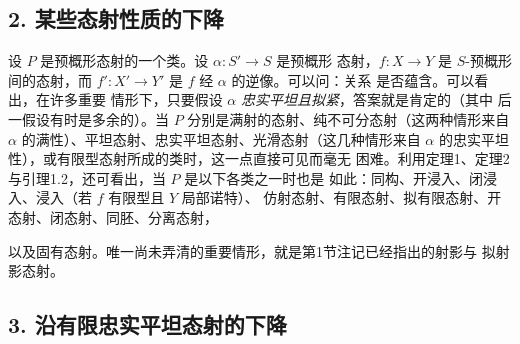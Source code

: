 \subsection*{2. 某些态射性质的下降}

设 $P$ 是预概形态射的一个类。设 $\alpha:S'\longrightarrow S$ 是预概形
态射，$f:X\longrightarrow Y$ 是 $S$-预概形间的态射，而
$f':X'\longrightarrow Y'$ 是 $f$ 经 $\alpha$ 的逆像。可以问：关系
 是否蕴含。可以看出，在许多重要
情形下，只要假设 $\alpha$ \emph{忠实平坦且拟紧}，答案就是肯定的（其中
后一假设有时是多余的）。当 $P$ 分别是满射的态射、纯不可分态射（这两种情形来自
$\alpha$ 的满性）、平坦态射、忠实平坦态射、光滑态射（这几种情形来自
$\alpha$ 的忠实平坦性），或有限型态射所成的类时，这一点直接可见而毫无
困难。利用定理1、定理2与引理1.2，还可看出，当 $P$ 是以下各类之一时也是
如此：同构、开浸入、闭浸入、浸入（若 $f$ 有限型且 $Y$ 局部诺特）、
仿射态射、有限态射、拟有限态射、开态射、闭态射、同胚、分离态射，

以及固有态射。唯一尚未弄清的重要情形，就是第1节注记已经指出的射影与
拟射影态射。

\subsection*{3. 沿有限忠实平坦态射的下降}


